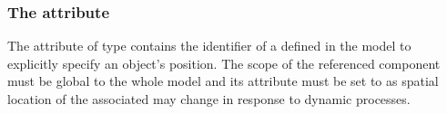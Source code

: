 \subsubsection{The  attribute}
\label{attr:variable}

The  attribute of type  contains the identifier of a \Parameter defined in the model to explicitly specify an object's position. The scope of the referenced \Parameter component must be global to the whole model and its  attribute must be set to  as spatial location of the associated \Compartment may change in response to dynamic processes.
